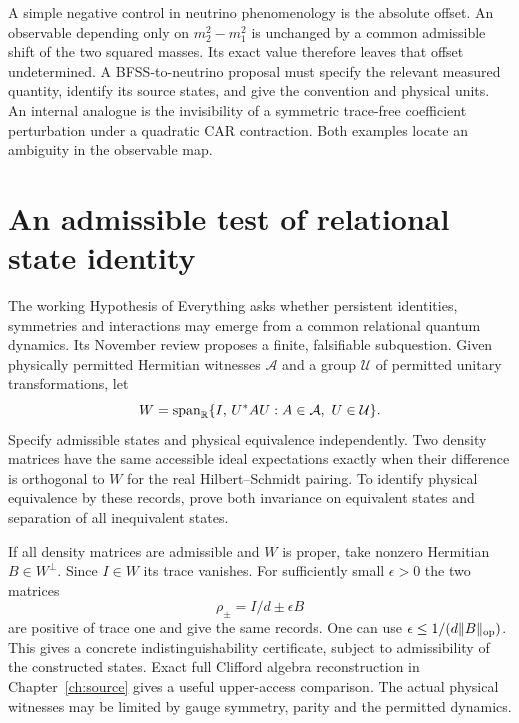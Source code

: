 A simple negative control in neutrino phenomenology is the absolute offset. An observable depending only on $m_2^2-m_1^2$ is unchanged by a common admissible shift of the two squared masses. Its exact value therefore leaves that offset undetermined. A BFSS-to-neutrino proposal must specify the relevant measured quantity, identify its source states, and give the convention and physical units. An internal analogue is the invisibility of a symmetric trace-free coefficient perturbation under a quadratic CAR contraction. Both examples locate an ambiguity in the observable map.


\section{An admissible test of relational state identity}
The working Hypothesis of Everything asks whether persistent identities, symmetries and interactions may emerge from a common relational quantum dynamics. Its November review proposes a finite, falsifiable subquestion. Given physically permitted Hermitian witnesses $\mathcal A$ and a group $\mathcal U$ of permitted unitary transformations, let
\[
 W=\operatorname{span}_{\mathbb R}\{I,\,U^\ast A U:
                       A\in\mathcal A,\ U\in\mathcal U\}.
\]
Specify admissible states and physical equivalence independently. Two density matrices have the same accessible ideal expectations exactly when their difference is orthogonal to $W$ for the real Hilbert--Schmidt pairing. To identify physical equivalence by these records, prove both invariance on equivalent states and separation of all inequivalent states.

If all density matrices are admissible and $W$ is proper, take nonzero Hermitian $B\in W^\perp$. Since $I\in W$ its trace vanishes. For sufficiently small $\epsilon>0$ the two matrices
\[
  \rho_\pm=I/d\pm\epsilon B
\]
are positive of trace one and give the same records. One can use
$\epsilon\le 1/(d\lVert B\rVert_{\mathrm{op}})$. This gives a concrete indistinguishability certificate, subject to admissibility of the constructed states. Exact full Clifford algebra reconstruction in Chapter~\ref{ch:source} gives a useful upper-access comparison. The actual physical witnesses may be limited by gauge symmetry, parity and the permitted dynamics.

